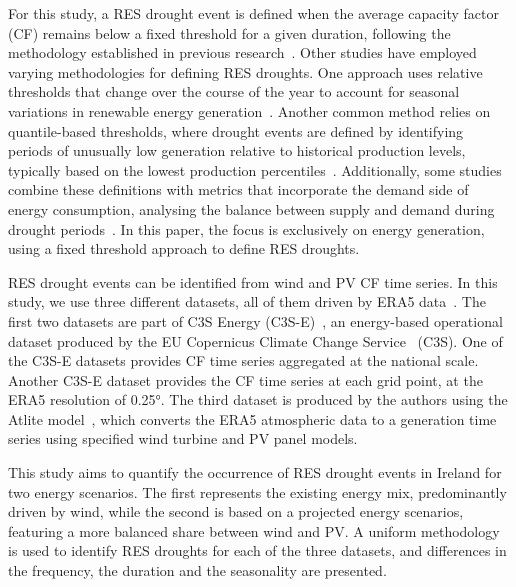 \documentclass[a4paper, 11pt]{article}
\begin{document}
For this study, a RES drought event is defined when the average capacity factor (CF) remains below a fixed threshold for a given duration, following the methodology established in previous research~\cite{kaspar2019drought, ohba2022drought, mockert2023drought, mayer2023drought}. Other studies have employed varying methodologies for defining RES droughts. One approach uses relative thresholds that change over the course of the year to account for seasonal variations in renewable energy generation~\cite{raynaud2018drought, rinaldi2021drought, gangopadhyay2022drought, allen2023drought, kapica2024drought}. Another common method relies on quantile-based thresholds, where drought events are defined by identifying periods of unusually low generation relative to historical production levels, typically based on the lowest production percentiles~\cite{bracken2024drought, allen2023drought}. Additionally, some studies combine these definitions with metrics that incorporate the demand side of energy consumption, analysing the balance between supply and demand during drought periods~\cite{raynaud2018drought, rinaldi2021drought, allen2023drought, bracken2024drought}. In this paper, the focus is exclusively on energy generation, using a fixed threshold approach to define RES droughts. 

RES drought events can be identified from wind and PV CF time series. In this study, we use three different datasets, all of them driven by ERA5 data~\cite{hersbach2020era5}. The first two datasets are part of C3S Energy (C3S-E)~\cite{cds2023energy}, an energy-based operational dataset produced by the EU Copernicus Climate Change Service~\cite{dubus2023energy} (C3S). One of the C3S-E datasets provides CF time series aggregated at the national scale. Another C3S-E dataset provides the CF time series at each grid point, at the ERA5 resolution of 0.25°. The third dataset is produced by the authors using the Atlite model~\cite{hofman2021atlite}, which converts the  ERA5 atmospheric data to a generation time series using specified wind turbine and PV panel models. 

This study aims to quantify the occurrence of RES drought events in Ireland for two energy scenarios. The first represents the existing energy mix, predominantly driven by wind, while the second is based on a projected energy scenarios, featuring a more balanced share between wind and PV. A uniform methodology is used to identify RES droughts for each of the three datasets, and differences in the frequency, the duration and the seasonality are presented. 
\end{document}
